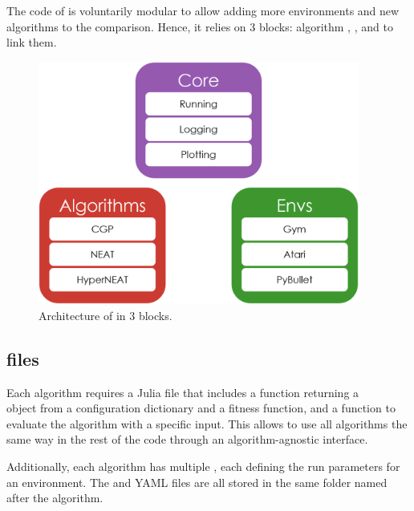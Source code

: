 The code of \berl is voluntarily modular to allow adding more environments and new algorithms to the comparison. Hence, it relies on 3 blocks: algorithm , , and  to link them.


\begin{figure}[H]
 \centering
 \captionsetup{justification=centering, margin=0.5cm}
 \includegraphics[height=8cm]{images/berl_archi.png}
\caption{Architecture of \berl in 3 blocks.}
 \label{fig:time-diff}
\end{figure}

\subsection{ files}

Each algorithm requires a  Julia file that includes a function returning a \\ object from a configuration dictionary and a fitness function, and a  function to evaluate the algorithm with a specific input. This allows to use all algorithms the same way in the rest of the code through an algorithm-agnostic interface. 

Additionally, each algorithm has multiple , each defining the run parameters for an environment. The  and YAML files are all stored in the same folder named after the algorithm.

